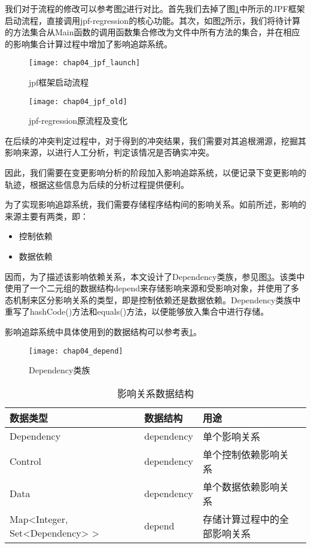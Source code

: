 我们对于流程的修改可以参考图\ref {impact_process_old}进行对比。首先我们去掉了图\ref {impact_process}中所示的JPF框架启动流程，直接调用jpf-regression的核心功能。其次，如图\ref {impact_process_old}所示，我们将待计算的方法集合从Main函数的调用函数集合修改为文件中所有方法的集合，并在相应的影响集合计算过程中增加了影响追踪系统。

\begin{figure}[H]
	\centering
	\texttt{[image: chap04\_jpf\_launch]}
	\caption {jpf框架启动流程}
	\label {impact_process}	
\end{figure}


\begin{figure}
	\centering
	\texttt{[image: chap04\_jpf\_old]}
	\caption {jpf-regression原流程及变化}
	\label {impact_process_old}	
\end{figure}



在后续的冲突判定过程中，对于得到的冲突结果，我们需要对其追根溯源，挖掘其影响来源，以进行人工分析，判定该情况是否确实冲突。

因此，我们需要在变更影响分析的阶段加入影响追踪系统，以便记录下变更影响的轨迹，根据这些信息为后续的分析过程提供便利。

为了实现影响追踪系统，我们需要存储程序结构间的影响关系。如前所述，影响的来源主要有两类，即：
\begin{itemize}
	\item 控制依赖
	\item 数据依赖
\end{itemize}

因而，为了描述该影响依赖关系，本文设计了Dependency类族，参见图\ref {class_depend}。该类中使用了一个二元组的数据结构depend来存储影响来源和受影响对象，并使用了多态机制来区分影响关系的类型，即是控制依赖还是数据依赖。Dependency类族中重写了hashCode()方法和equals()方法，以便能够放入集合中进行存储。

影响追踪系统中具体使用到的数据结构可以参考表\ref {track_data}。

\begin{figure}[H]
	\centering
	\texttt{[image: chap04\_depend]}
	\caption {Dependency类族}
	\label {class_depend}	
\end{figure}

\begin{table}
	\caption{影响关系数据结构}
	\label{track_data}
	\centering
	\begin{tabular}{lllc}
		\toprule[1.5pt]
		{\heiti 数据类型} &{\heiti 数据结构} & {\heiti 用途} \\\midrule[1pt]
		Dependency & dependency & 单个影响关系 \\
		Control & dependency & 单个控制依赖影响关系 \\
		Data & dependency & 单个数据依赖影响关系 \\
		Map<Integer, Set<Dependency> > & depend & 存储计算过程中的全部影响关系\\
		\bottomrule[1.5pt]
	\end{tabular}
\end{table}

